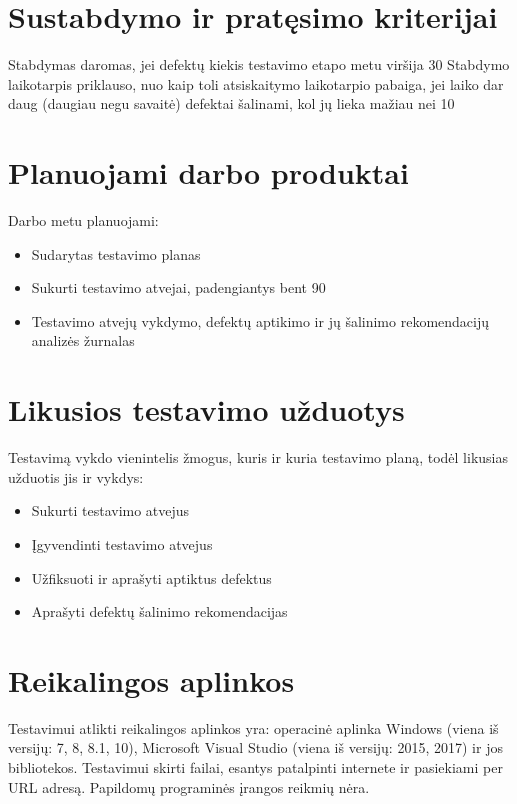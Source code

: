 \section{Sustabdymo ir pratęsimo kriterijai}

Stabdymas daromas, jei defektų kiekis testavimo etapo metu viršija 30%
Stabdymo laikotarpis priklauso, nuo kaip toli atsiskaitymo laikotarpio pabaiga, jei laiko dar daug (daugiau negu savaitė) defektai šalinami, kol jų lieka mažiau nei 10%

\section{Planuojami darbo produktai}

Darbo metu planuojami: 

\begin{itemize}
	\item Sudarytas testavimo planas
	\item Sukurti testavimo atvejai, padengiantys bent 90%
	\item Testavimo atvejų vykdymo, defektų aptikimo ir jų šalinimo rekomendacijų analizės žurnalas
\end{itemize}

\section{Likusios testavimo užduotys}

Testavimą vykdo vienintelis žmogus, kuris ir kuria testavimo planą, todėl likusias užduotis jis ir vykdys:

\begin{itemize}
	\item Sukurti testavimo atvejus
	\item Įgyvendinti testavimo atvejus
	\item Užfiksuoti ir aprašyti aptiktus defektus
	\item Aprašyti defektų šalinimo rekomendacijas
\end{itemize}

\section{Reikalingos aplinkos}

Testavimui atlikti reikalingos aplinkos yra: operacinė aplinka Windows (viena iš versijų: 7, 8, 8.1, 10), Microsoft Visual Studio (viena iš versijų: 2015, 2017) ir jos bibliotekos. 
Testavimui skirti failai, esantys patalpinti internete ir pasiekiami per URL adresą. 
Papildomų programinės įrangos reikmių nėra.

